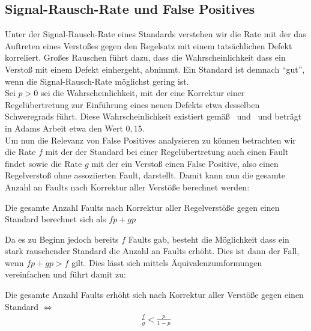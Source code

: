 \documentclass[a4paper,UKenglish,cleveref, autoref]{templates/lipics-v2019}
\begin{document}
    \subsection{Signal-Rausch-Rate und False Positives}
    \label{subsec:signal-rausch-rate-und-false-positives}

    Unter der Signal-Rausch-Rate eines Standards verstehen wir die Rate mit der das Auftreten eines Verstoßes gegen den Regelsatz mit einem
    tatsächlichen Defekt korreliert.
    Großes Rauschen führt dazu, dass die Wahrscheinlichkeit dass ein Verstoß mit einem Defekt einhergeht, abnimmt.
    Ein Standard ist demnach \enquote{gut}, wenn die Signal-Rausch-Rate möglichst gering ist.\\
    Sei $p > 0$ sei die Wahrscheinlichkeit, mit der eine Korrektur einer Regelübertretung zur Einführung eines neuen Defekts
    etwa desselben Schweregrads führt.
    Diese Wahrscheinlichkeit existiert gemäß~\cite{transgression-data} und~\cite{hatton2007language} und beträgt in
    Adams Arbeit etwa den Wert $0,15$.\\
    Um nun die Relevanz von False Positives analysieren zu können betrachten wir die Rate $f$ mit der der Standard
    bei einer Regelübertretung auch einen Fault findet sowie die Rate $g$ mit der ein Verstoß einen False Positive, also
    einen Regelverstoß ohne assoziierten Fault, darstellt.
    Damit kann nun die gesamte Anzahl an Faults nach Korrektur aller Verstöße berechnet werden:
    \begin{lemma}
        Die gesamte Anzahl Faults nach Korrektur aller Regelverstöße gegen einen Standard berechnet sich als $fp + gp$
    \end{lemma}

    Da es zu Beginn jedoch bereits $f$ Faults gab, besteht die Möglichkeit dass ein stark rauschender Standard die Anzahl
    an Faults erhöht.
    Dies ist dann der Fall, wenn $fp + gp > f$ gilt.
    Dies lässt sich mittels Äquivalenzumformungen vereinfachen und führt damit zu:

    \begin{theorem}
        Die gesamte Anzahl Faults erhöht sich nach Korrektur aller Verstöße gegen einen Standard $\iff$
        \begin{gather*}
            \frac{f}{g} < \frac{p}{1-p}
        \end{gather*}
    \end{theorem}
\end{document}
